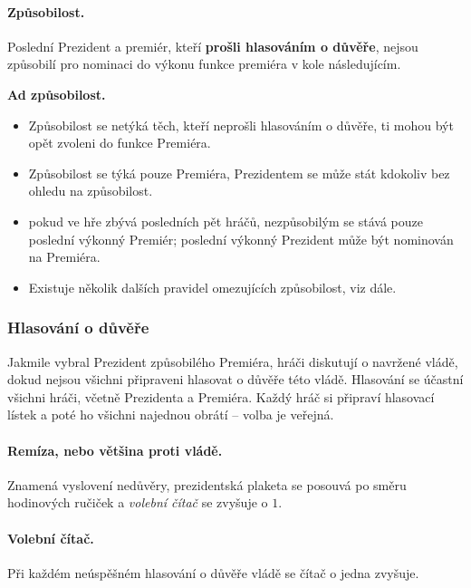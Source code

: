 \documentclass{article}
\newenvironment{redbox}{
    \color{red}\it
}
{
    \normalsize
}
\begin{document}
            \paragraph{Způsobilost.} Poslední Prezident a premiér, kteří \textbf{prošli hlasováním o důvěře}, nejsou způsobilí pro nominaci do výkonu funkce premiéra v kole následujícím.

            \begin{redbox}
                \textbf{Ad způsobilost.}
                \begin{itemize}
                    \item Způsobilost se netýká těch, kteří neprošli hlasováním o důvěře, ti mohou být opět zvoleni do funkce Premiéra.
                    \item Způsobilost se týká pouze Premiéra, Prezidentem se může stát kdokoliv bez ohledu na způsobilost.
                    \item pokud ve hře zbývá posledních pět hráčů, nezpůsobilým se stává pouze poslední výkonný Premiér; poslední výkonný Prezident může být nominován na Premiéra.
                    \item Existuje několik dalších pravidel omezujících způsobilost, viz dále.
                \end{itemize}
            \end{redbox}

        \subsubsection{Hlasování o důvěře}

            Jakmile vybral Prezident způsobilého Premiéra, hráči diskutují o navržené vládě, dokud nejsou všichni připraveni hlasovat o důvěře této vládě. Hlasování se účastní všichni hráči, včetně Prezidenta a Premiéra. Každý hráč si připraví hlasovací lístek a poté ho všichni najednou obrátí -- volba je veřejná.

            \paragraph{Remíza, nebo většina proti vládě.} Znamená vyslovení nedůvěry, prezidentská plaketa se posouvá po směru hodinových ručiček a {\it volební čítač} se zvyšuje o $1$.

            \paragraph{Volební čítač.} Při každém neúspěšném hlasování o důvěře vládě se čítač o jedna zvyšuje.
\end{document}
